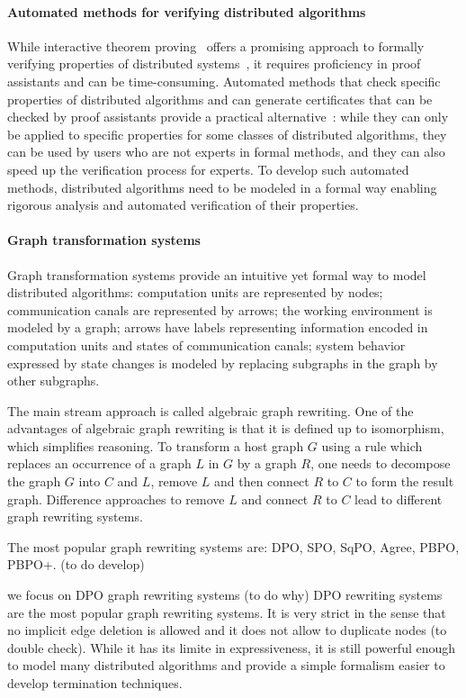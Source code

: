 \paragraph{Automated methods for verifying distributed algorithms}
While interactive theorem proving~\cite{harrison2014history} offers a promising approach to formally verifying properties of distributed systems~\cite{plump2024formalisingDPO,potop2019formal,courtieu2016certified},  
it requires proficiency in proof assistants and can be
time-consuming. Automated methods that check specific properties of distributed algorithms and can generate certificates that can be checked by proof assistants provide a practical alternative~\cite{contejean2011automated,giesl2014proving}: while they can only be applied to specific properties for some classes of distributed algorithms, they can be used by users who are not experts in formal methods, and they can also speed up the verification process for experts. To develop such automated methods, distributed algorithms need to be modeled in a formal way enabling rigorous analysis and automated verification of their properties.


 \paragraph{Graph transformation systems}
 Graph transformation systems provide an intuitive yet formal way to model distributed algorithms: computation units are represented by nodes; communication canals are represented by arrows; the working environment is modeled by a graph; arrows have labels representing information encoded in computation units and states of communication canals; system behavior expressed by state changes is modeled by replacing subgraphs in the graph by other subgraphs.

 The main stream approach is called algebraic graph rewriting. One of the advantages of algebraic graph rewriting is that it is defined up to isomorphism, which simplifies reasoning. 
  To transform a host graph $G$ using a rule which replaces an occurrence of a graph $L$ in $G$ by a graph $R$, one needs to decompose the graph $G$ into $C$ and $L$, remove $L$ and then connect $R$ to $C$ to form the result graph. Difference approaches to remove $L$ and connect $R$ to $C$ lead to different graph rewriting systems. 
  
  The most popular graph rewriting systems are:
   DPO, SPO, SqPO, Agree, PBPO, PBPO+. (to do develop)

we focus on DPO graph rewriting systems (to do why)
DPO rewriting systems are the most popular graph rewriting systems. It is very strict in the sense that no implicit edge deletion is allowed and it does not allow to duplicate nodes (to double check). While it has its limite in expressiveness, it is still powerful enough to model many distributed algorithms and provide a simple formalism easier to develop termination techniques.

